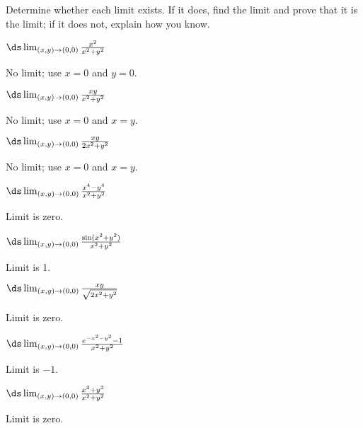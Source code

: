 \begin{exercises}

Determine whether each limit exists. If it does, find the limit
and prove that it is the limit; if it does not, explain how you know.

\begin{exercise} $\ds\lim_{(x,y)\to(0,0)}{x^2\over x^2+y^2}$
\begin{answer} No limit; use $x=0$ and $y=0$.
\end{answer}\end{exercise}

\begin{exercise} $\ds\lim_{(x,y)\to(0,0)}{xy\over x^2+y^2}$
\begin{answer} No limit; use $x=0$ and $x=y$.
\end{answer}\end{exercise}

\begin{exercise} $\ds\lim_{(x,y)\to(0,0)}{xy\over 2x^2+y^2}$
\begin{answer} No limit; use $x=0$ and $x=y$.
\end{answer}\end{exercise}

\begin{exercise} $\ds\lim_{(x,y)\to(0,0)}{x^4-y^4\over x^2+y^2}$
\begin{answer} Limit is zero.
\end{answer}\end{exercise}

\begin{exercise} $\ds\lim_{(x,y)\to(0,0)}{\sin(x^2+y^2)\over x^2+y^2}$
\begin{answer} Limit is 1.
\end{answer}\end{exercise}

\begin{exercise} $\ds\lim_{(x,y)\to(0,0)}{xy\over \sqrt{2x^2+y^2}}$
\begin{answer} Limit is zero.
\end{answer}\end{exercise}

\begin{exercise} $\ds\lim_{(x,y)\to(0,0)} {e^{-x^2-y^2}-1\over x^2+y^2}$
\begin{answer} Limit is $-1$.
\end{answer}\end{exercise}

\begin{exercise} $\ds\lim_{(x,y)\to(0,0)}{x^3+y^3\over x^2+y^2}$
\begin{answer} Limit is zero.
\end{answer}\end{exercise}


\end{exercises}
